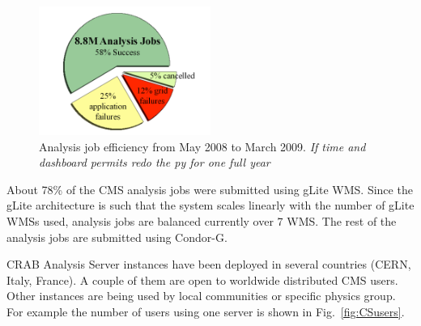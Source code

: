\begin{figure}
\includegraphics[width=0.5\textwidth]{figures/AnalysisJobEffMay08March09.png}
\caption{Analysis job efficiency from May 2008 to March 2009. \emph{If time and dashboard permits redo the py for one full year} }
\label{fig:AnalysisJobEffMay08March09}
\end{figure}

About 78\% of the CMS analysis jobs were submitted using gLite WMS.  Since the gLite architecture is such that the system scales linearly with the number of gLite WMSs used, analysis jobs are balanced currently over 7
WMS. The rest of the analysis jobs are submitted using Condor-G.

CRAB Analysis Server instances have been deployed in several countries (CERN, Italy, France). A couple of them are open to worldwide distributed CMS users. Other instances are being used by local communities or specific physics group.
For example the number of users using one server is shown in Fig.~\ref{fig:CSusers}.

